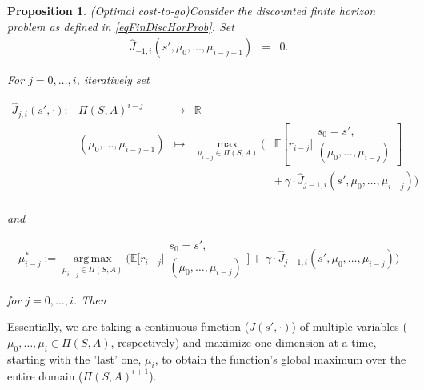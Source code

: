 \documentclass[11pt]{article} %
\newtheorem{prop}{Proposition}
\DeclareMathOperator*{\argmax}{arg\,max}
\begin{document}
\begin{prop}(Optimal cost-to-go)\label{lemBuildingFiniteSolution}
	Consider the discounted finite horizon problem as defined in \ref{eqFinDiscHorProb}. Set
\begin{equation}\label{eqCostToGoFunctionals}
	\begin{array}{rlll}
		\hat{J}_{-1,i}(s',\mu_0,\dots,\mu_{i-j-1}) 	& = & 0.
	\end{array}
\end{equation}

For $j=0,\dots,i$, iteratively set

\begin{equation}
	\begin{array}{rclll}
		\hat{J}_{j,i}(s',\cdot):	& \Pi(S,A)^{i-j}				& \rightarrow	& \mathbb{R} & \\
						& (\mu_0,\dots,\mu_{i-j-1})	& \mapsto 	& \max\limits_{\mu_{i-j} \in \Pi(S,A)} \Big( & \mathbb{E}\left[r_{i-j} \bigg| \begin{array}{c}
																							s_0 = s', \\
																							(\mu_0,\dots,\mu_{i-j})
																						\end{array} 
																							\right] \\
						&				&	&								& + \, \gamma \cdot \hat{J}_{j-1,i}(s',\mu_0,\dots,\mu_{i-j}) \Big) \\
	\end{array}
\end{equation}

and

\begin{equation}
		\mu^*_{i-j} := \argmax\limits_{\mu_{i-j} \in \Pi(S,A)} \Big(	\mathbb{E}\Big[r_{i-j} \bigg| 	\begin{array}{c}
																			s_0 = s', \\
																			(\mu_0,\dots,\mu_{i-j})
																		\end{array} 
																		\Big] + \, \gamma \cdot \hat{J}_{j-1,i}(s',\mu_0,\dots,\mu_{i-j}) \Big)
\end{equation}

for $j=0,\dots,i$. Then



\end{prop}

Essentially, we are taking a continuous function ($J(s',\cdot)$) of multiple variables ($\mu_0,\dots,\mu_i \in \Pi(S,A)$, respectively) and maximize one dimension at a time, starting with the 'last' one, $\mu_i$, to obtain the function's global maximum over the entire domain ($\Pi(S,A)^{i+1}$).
\end{document}
